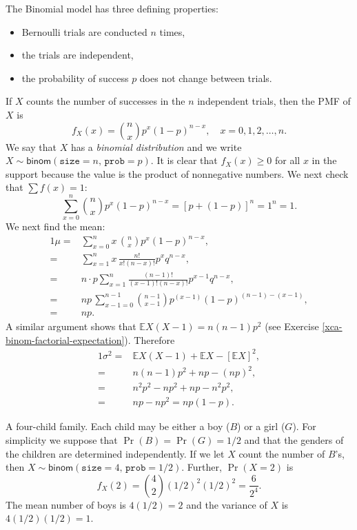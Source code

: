 \documentclass[captions=tableheading]{scrbook}
\begin{document}
The Binomial model has three defining properties:
\begin{itemize}
\item Bernoulli trials are conducted \(n\) times,
\item the trials are independent,
\item the probability of success \(p\) does not change between trials.
\end{itemize}
If \(X\) counts the number of successes in the \(n\) independent trials, then the PMF of \(X\) is 
\begin{equation}
f_{X}(x)={n \choose x}p^{x}(1-p)^{n-x},\quad x=0,1,2,\ldots,n.
\end{equation}
We say that \(X\) has a \emph{binomial distribution} and we write \(X\sim\mathsf{binom}(\mathtt{size}=n,\,\mathtt{prob}=p)\). It is clear that \(f_{X}(x)\geq0\) for all \(x\) in the support because the value is the product of nonnegative numbers. We next check that \(\sum f(x)=1\):
\[
\sum_{x=0}^{n}{n \choose x}p^{x}(1-p)^{n-x}=[p+(1-p)]^{n}=1^{n}=1.
\]
We next find the mean:
\begin{alignat*}{1}
\mu= & \sum_{x=0}^{n}x\,{n \choose x}p^{x}(1-p)^{n-x},\\
= & \sum_{x=1}^{n}x\,\frac{n!}{x!(n-x)!}p^{x}q^{n-x},\\
= & n\cdot p\sum_{x=1}^{n}\frac{(n-1)!}{(x-1)!(n-x)!}p^{x-1}q^{n-x},\\
= & np\,\sum_{x-1=0}^{n-1}{n-1 \choose x-1}p^{(x-1)}(1-p)^{(n-1)-(x-1)},\\
= & np.
\end{alignat*}
A similar argument shows that \(\mathbb{E} X(X-1)=n(n-1)p^{2}\) (see Exercise \ref{xca-binom-factorial-expectation}). Therefore
\begin{alignat*}{1}
\sigma^{2}= & \mathbb{E} X(X-1)+\mathbb{E} X-[\mathbb{E} X]^{2},\\
= & n(n-1)p^{2}+np-(np)^{2},\\
= & n^{2}p^{2}-np^{2}+np-n^{2}p^{2},\\
= & np-np^{2}=np(1-p).
\end{alignat*}

\begin{example}
A four-child family. Each child may be either a boy (\(B\)) or a girl (\(G\)). For simplicity we suppose that \(\Pr(B)=\Pr(G)=1/2\) and that the genders of the children are determined independently. If we let \(X\) count the number of \(B\)'s, then \(X\sim\mathsf{binom}(\mathtt{size}=4,\,\mathtt{prob}=1/2)\). Further, \(\Pr(X=2)\) is
\[
f_{X}(2)={4 \choose 2}(1/2)^{2}(1/2)^{2}=\frac{6}{2^{4}}.
\]
The mean number of boys is \(4(1/2)=2\) and the variance of \(X\) is \(4(1/2)(1/2)=1\).
\end{example}
\end{document}
